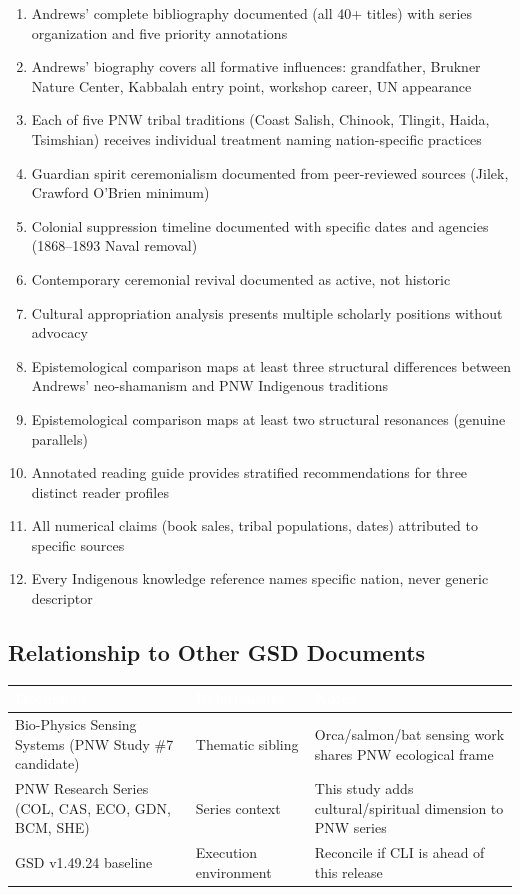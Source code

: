 \documentclass[11pt,letterpaper]{article}
\newcommand{\tableheader}[1]{\textbf{\sffamily\textcolor{white}{#1}}}
\begin{document}
\begin{enumerate}
  \item Andrews' complete bibliography documented (all 40+ titles) with series organization and five priority annotations
  \item Andrews' biography covers all formative influences: grandfather, Brukner Nature Center, Kabbalah entry point, workshop career, UN appearance
  \item Each of five PNW tribal traditions (Coast Salish, Chinook, Tlingit, Haida, Tsimshian) receives individual treatment naming nation-specific practices
  \item Guardian spirit ceremonialism documented from peer-reviewed sources (Jilek, Crawford O'Brien minimum)
  \item Colonial suppression timeline documented with specific dates and agencies (1868--1893 Naval removal)
  \item Contemporary ceremonial revival documented as active, not historic
  \item Cultural appropriation analysis presents multiple scholarly positions without advocacy
  \item Epistemological comparison maps at least three structural differences between Andrews' neo-shamanism and PNW Indigenous traditions
  \item Epistemological comparison maps at least two structural resonances (genuine parallels)
  \item Annotated reading guide provides stratified recommendations for three distinct reader profiles
  \item All numerical claims (book sales, tribal populations, dates) attributed to specific sources
  \item Every Indigenous knowledge reference names specific nation, never generic descriptor
\end{enumerate}

\subsection{Relationship to Other GSD Documents}

\begin{center}
\begin{tabularx}{\textwidth}{L{4cm}L{3cm}X}
\toprule
{}
\tableheader{Document} & \tableheader{Relationship} & \tableheader{Notes} \\
\midrule
Bio-Physics Sensing Systems (PNW Study \#7 candidate) & Thematic sibling & Orca/salmon/bat sensing work shares PNW ecological frame \\
PNW Research Series (COL, CAS, ECO, GDN, BCM, SHE) & Series context & This study adds cultural/spiritual dimension to PNW series \\
GSD v1.49.24 baseline & Execution environment & Reconcile if CLI is ahead of this release \\
\bottomrule
\end{tabularx}
\end{center}
\end{document}
